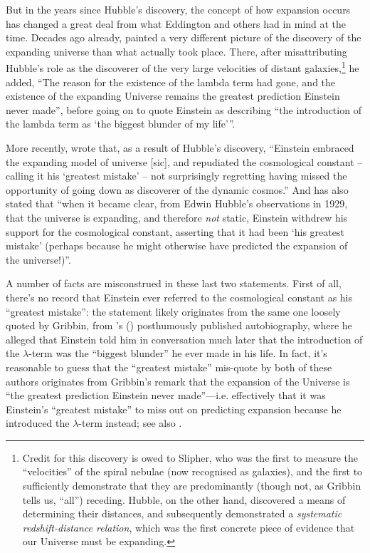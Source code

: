\documentclass[12 pt]{article}
\def\citeapos#1{\citeauthor{#1}'s (\citeyear{#1})}
\begin{document}
But in the years since Hubble's discovery, the concept of how expansion occurs has changed a great deal from what Eddington and others had in mind at the time. Decades ago already, \citet{Gribbin1986} painted a very different picture of the discovery of the expanding universe than what actually took place. There, after misattributing Hubble's role as the discoverer of the very large velocities of distant galaxies,\footnote{Credit for this discovery is owed to Slipher, who was the first to measure the ``velocities'' of the spiral nebulae (now recognised as galaxies), and the first to sufficiently demonstrate that they are predominantly (though not, as Gribbin tells us, ``all'') receding. Hubble, on the other hand, discovered a means of determining their distances, and subsequently demonstrated a \textit{systematic redshift-distance relation}, which was the first concrete piece of evidence that our Universe must be expanding.}  he added, ``The reason for the existence of the lambda term had gone, and the existence of the expanding Universe remains the greatest prediction Einstein never made'', before going on to quote Einstein as describing ``the introduction of the lambda term as `the biggest blunder of my life'''.

More recently, \citet{Dainton2001} wrote that, as a result of Hubble's discovery, ``Einstein embraced the expanding model of universe [sic], and repudiated the cosmological constant -- calling it his `greatest mistake' -- not surprisingly regretting having missed the opportunity of going down as discoverer of the dynamic cosmos.'' And \citet{Penrose2005} has also stated that ``when it became clear, from Edwin Hubble's observations in 1929, that the universe is expanding, and therefore \textit{not} static, Einstein withdrew his support for the cosmological constant, asserting that it had been `his greatest mistake' (perhaps because he might otherwise have predicted the expansion of the universe!)''. 

A number of facts are misconstrued in these last two statements. First of all, there's no record that Einstein ever referred to the cosmological constant as his ``greatest mistake'': the statement likely originates from the same one loosely quoted by Gribbin, from \citeapos{Gamow1970} posthumously published autobiography, where he alleged that Einstein told him in conversation much later that the introduction of the $\lambda$-term was the ``biggest blunder'' he ever made in his life. In fact, it's reasonable to guess that the ``greatest mistake'' mis-quote by both of these authors originates from Gribbin's remark that the expansion of the Universe is ``the greatest prediction Einstein never made''---i.e. effectively that it was Einstein's ``greatest mistake'' to miss out on predicting expansion because he introduced the $\lambda$-term instead; see also \citet{Kolb2007}. 
\end{document}
